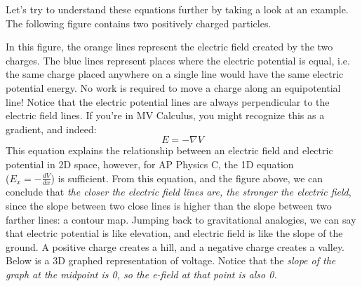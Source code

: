 \documentclass[12pt, titlepage]{article}
\begin{document}
Let's try to understand these equations further by taking a look at an example. The following figure contains two positively charged particles.
\begin{figure}[htp]
    \centering
\end{figure} \newpage
In this figure, the orange lines represent the electric field created by the two charges. The blue lines represent places where the electric potential is equal, i.e. the same charge placed anywhere on a single line would have the same electric potential energy. No work is required to move a charge along an equipotential line! Notice that the electric potential lines are always perpendicular to the electric field lines. If you're in MV Calculus, you might recognize this as a gradient, and indeed:
\begin{equation*}
    E=-\nabla V
\end{equation*}
This equation explains the relationship between an electric field and electric potential in 2D space, however, for AP Physics C, the 1D equation \\ ($E_x=-\frac{dV}{dx}$) is sufficient. From this equation, and the figure above, we can conclude that \textit{the closer the electric field lines are, the stronger the electric field}, since the slope between two close lines is higher than the slope between two farther lines: a contour map. Jumping back to gravitational analogies, we can say that electric potential is like elevation, and electric field is like the slope of the ground. A positive charge creates a hill, and a negative charge creates a valley. Below is a 3D graphed representation of voltage. Notice that the \textit{slope of the graph at the midpoint is 0, so the e-field at that point is also 0.}

\begin{center}
\end{center}
\end{document}
